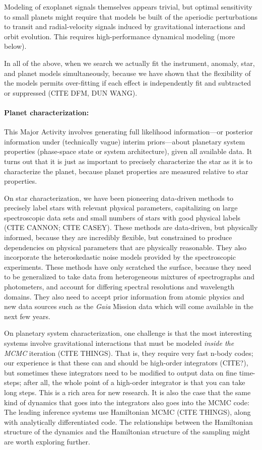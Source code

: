 \documentclass[12pt]{article}
\begin{document}
Modeling of exoplanet signals themselves appears trivial, but optimal
sensitivity to small planets might require that models be built of the
aperiodic perturbations to transit and radial-velocity signals induced
by gravitational interactions and orbit evolution. This requires
high-performance dynamical modeling (more below).

In all of the above, when we search we actually fit the instrument,
anomaly, star, and planet models simultaneously, because we have shown
that the flexibility of the models permits over-fitting if each effect
is independently fit and subtracted or suppressed (CITE DFM, DUN
WANG).

\paragraph{Planet characterization:}
This Major Activity involves generating full likelihood
information---or posterior information under (technically vague)
interim priors---about planetary system properties (phase-space state
or system architecture), given all available data. It turns out that
it is just as important to precisely characterize the star as it is to
characterize the planet, because planet properties are measured
relative to star properties.

On star characterization, we have been pioneering data-driven methods
to precisely label stars with relevant physical parameters,
capitalizing on large spectroscopic data sets and small numbers of
stars with good physical labels (CITE CANNON; CITE CASEY). These
methods are data-driven, but physically informed, because they are
incredibly flexible, but constrained to produce dependencies on
physical parameters that are physically reasonable. They also
incorporate the heteroskedastic noise models provided by the
spectroscopic experiments. These methods have only scratched the
surface, because they need to be generalized to take data from
heterogeneous mixtures of spectrographs and photometers, and account
for differing spectral resolutions and wavelength domains. They also
need to accept prior information from atomic physics and new data
sources such as the \textsl{Gaia} Mission data which will come
available in the next few years.

On planetary system characterization, one challenge is that the most
interesting systems involve gravitational interactions that must be
modeled \emph{inside the MCMC} iteration (CITE THINGS). That is, they
require very fast n-body codes; our experience is that these can and
should be high-order integrators (CITE?), but sometimes these
integrators need to be modified to output data on fine time-steps;
after all, the whole point of a high-order integrator is that you can
take long steps. This is a rich area for new research. It is also the
case that the same kind of dynamics that goes into the integrators
also goes into the MCMC code: The leading inference systems use
Hamiltonian MCMC (CITE THINGS), along with analytically differentiated
code. The relationships between the Hamiltonian structure of the
dynamics and the Hamiltonian structure of the sampling might are worth
exploring further.
\end{document}
